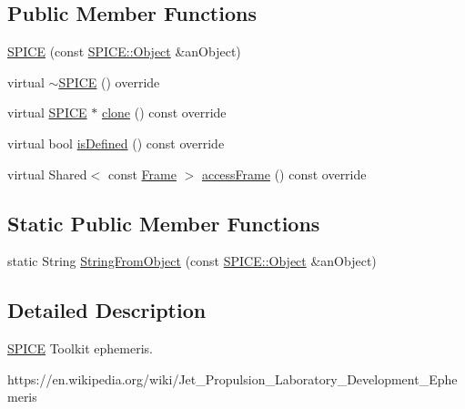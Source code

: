 \subsection*{Public Member Functions}
\begin{DoxyCompactItemize}
\item 
\hyperlink{classlibrary_1_1physics_1_1env_1_1ephem_1_1_s_p_i_c_e_a736d504ac455e1c1ccadd03f11611e4b}{S\+P\+I\+CE} (const \hyperlink{classlibrary_1_1physics_1_1env_1_1ephem_1_1_s_p_i_c_e_a86f1a863677210ba8884807cc725c0f8}{S\+P\+I\+C\+E\+::\+Object} \&an\+Object)
\item 
virtual \hyperlink{classlibrary_1_1physics_1_1env_1_1ephem_1_1_s_p_i_c_e_ae6f089a215f400957d5cad057997d007}{$\sim$\+S\+P\+I\+CE} () override
\item 
virtual \hyperlink{classlibrary_1_1physics_1_1env_1_1ephem_1_1_s_p_i_c_e}{S\+P\+I\+CE} $\ast$ \hyperlink{classlibrary_1_1physics_1_1env_1_1ephem_1_1_s_p_i_c_e_a7d397f5472ec2e14d85fa493cb7c9ae0}{clone} () const override
\item 
virtual bool \hyperlink{classlibrary_1_1physics_1_1env_1_1ephem_1_1_s_p_i_c_e_a54fb3fb8768a72f515231dac083eb9cb}{is\+Defined} () const override
\item 
virtual Shared$<$ const \hyperlink{classlibrary_1_1physics_1_1coord_1_1_frame}{Frame} $>$ \hyperlink{classlibrary_1_1physics_1_1env_1_1ephem_1_1_s_p_i_c_e_a20b94d4f05b17a2eb3ba986464da44a8}{access\+Frame} () const override
\end{DoxyCompactItemize}
\subsection*{Static Public Member Functions}
\begin{DoxyCompactItemize}
\item 
static String \hyperlink{classlibrary_1_1physics_1_1env_1_1ephem_1_1_s_p_i_c_e_aebeefe1b806d93e576a0b08c8d24b250}{String\+From\+Object} (const \hyperlink{classlibrary_1_1physics_1_1env_1_1ephem_1_1_s_p_i_c_e_a86f1a863677210ba8884807cc725c0f8}{S\+P\+I\+C\+E\+::\+Object} \&an\+Object)
\end{DoxyCompactItemize}


\subsection{Detailed Description}
\hyperlink{classlibrary_1_1physics_1_1env_1_1ephem_1_1_s_p_i_c_e}{S\+P\+I\+CE} Toolkit ephemeris. 

https\+://en.wikipedia.\+org/wiki/\+Jet\+\_\+\+Propulsion\+\_\+\+Laboratory\+\_\+\+Development\+\_\+\+Ephemeris 

